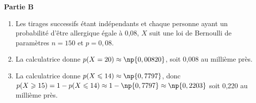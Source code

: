 \textbf{Partie B}

\medskip









\begin{enumerate}
\item 


Les tirages successifs étant indépendants et chaque personne ayant un probabilité d'être allergique égale à 0,08, $X$ suit une loi de Bernoulli de paramètres $n = 150$ et $p = 0,08$.
\item 
La calculatrice donne $p(X = 20) \approx \np{0,00820}$, soit 0,008 au millième près.
\item 
La calculatrice donne $p(X \leqslant 14) \approx \np{0,7797}$, donc $p(X \geqslant 15) = 1 - p(X \leqslant 14) \approx 1 - \np{0,7797} \approx \np{0,2203}$ soit 0,220 au millième près.
\end{enumerate}

\bigskip
